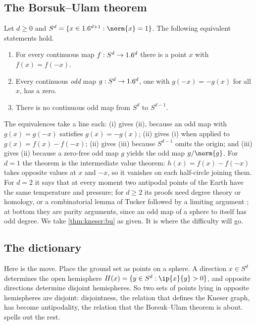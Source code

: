 \begin{refsection}
\subsection{The Borsuk--Ulam theorem}

\begin{theorem}\label{thm:kneser:bu}
Let $d\ge0$ and $S^d=\{x\in\R^{d+1}:\norm{x}=1\}$. The following equivalent statements hold.
\begin{enumerate}
\item For every continuous map $f:S^d\to1.6^d$ there is a point $x$ with $f(x)=f(-x)$.
\item Every continuous \emph{odd} map $g:S^d\to1.6^d$, one with $g(-x)=-g(x)$ for all $x$, has a zero.
\item There is no continuous odd map from $S^d$ to $S^{d-1}$.
\end{enumerate}
\end{theorem}

The equivalences take a line each: (i) gives (ii), because an odd map with $g(x)=g(-x)$ satisfies $g(x)=-g(x)$; (ii) gives (i) when applied to $g(x)=f(x)-f(-x)$; (ii) gives (iii) because $S^{d-1}$ omits the origin; and (iii) gives (ii) because a zero-free odd map $g$ yields the odd map $g/\norm{g}$. For $d=1$ the theorem is the intermediate value theorem: $h(x)=f(x)-f(-x)$ takes opposite values at $x$ and $-x$, so it vanishes on each half-circle joining them. For $d=2$ it says that at every moment two antipodal points of the Earth have the same temperature and pressure; for $d\ge2$ its proofs need degree theory or homology, or a combinatorial lemma of Tucker followed by a limiting argument \parencite[Chapter~2]{Matousek2003}; at bottom they are parity arguments, since an odd map of a sphere to itself has odd degree. We take \cref{thm:kneser:bu} as given. It is where the difficulty will go.

\subsection{The dictionary}

Here is the move. Place the ground set as points on a sphere. A direction $x\in S^d$ determines the open hemisphere $H(x)=\{y\in S^d:\ip{x}{y}>0\}$, and opposite directions determine disjoint hemispheres. So two sets of points lying in opposite hemispheres are disjoint: disjointness, the relation that defines the Kneser graph, has become antipodality, the relation that the Borsuk--Ulam theorem is about.  spells out the rest.


\end{refsection}

